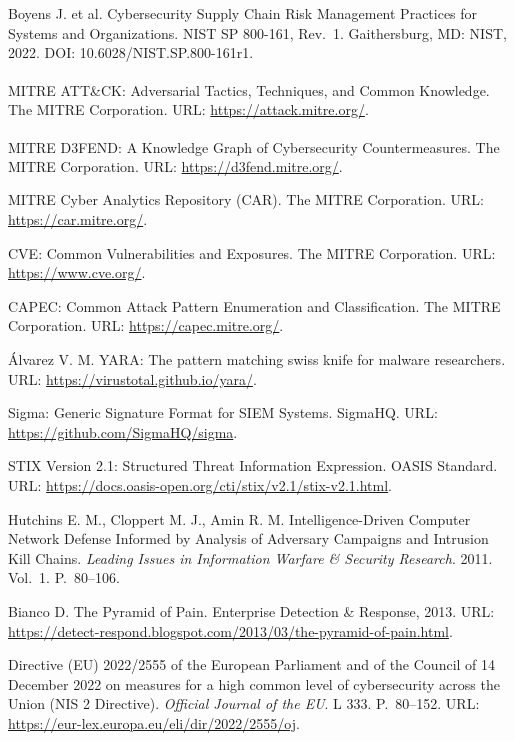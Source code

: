  Boyens J. et al. Cybersecurity Supply Chain Risk Management Practices for Systems and Organizations. NIST SP 800-161, Rev.~1. Gaithersburg, MD: NIST, 2022. DOI: 10.6028/NIST.SP.800-161r1.

 MITRE ATT\&CK\textsuperscript{\textregistered}: Adversarial Tactics, Techniques, and Common Knowledge. The MITRE Corporation. URL: \url{https://attack.mitre.org/}.

 MITRE D3FEND\textsuperscript{\texttrademark}: A Knowledge Graph of Cybersecurity Countermeasures. The MITRE Corporation. URL: \url{https://d3fend.mitre.org/}.

 MITRE Cyber Analytics Repository (CAR). The MITRE Corporation. URL: \url{https://car.mitre.org/}.

 CVE: Common Vulnerabilities and Exposures. The MITRE Corporation. URL: \url{https://www.cve.org/}.

 CAPEC: Common Attack Pattern Enumeration and Classification. The MITRE Corporation. URL: \url{https://capec.mitre.org/}.

 Álvarez V. M. YARA: The pattern matching swiss knife for malware researchers. URL: \url{https://virustotal.github.io/yara/}.

 Sigma: Generic Signature Format for SIEM Systems. SigmaHQ. URL: \url{https://github.com/SigmaHQ/sigma}.

 STIX Version 2.1: Structured Threat Information Expression. OASIS Standard. URL: \url{https://docs.oasis-open.org/cti/stix/v2.1/stix-v2.1.html}.

 Hutchins E. M., Cloppert M. J., Amin R. M. Intelligence-Driven Computer Network Defense Informed by Analysis of Adversary Campaigns and Intrusion Kill Chains. \emph{Leading Issues in Information Warfare \& Security Research}. 2011. Vol.~1. P.~80--106.

 Bianco D. The Pyramid of Pain. Enterprise Detection \& Response, 2013. URL: \url{https://detect-respond.blogspot.com/2013/03/the-pyramid-of-pain.html}.

 Directive (EU) 2022/2555 of the European Parliament and of the Council of 14 December 2022 on measures for a high common level of cybersecurity across the Union (NIS 2 Directive). \emph{Official Journal of the EU}. L 333. P.~80--152. URL: \url{https://eur-lex.europa.eu/eli/dir/2022/2555/oj}.

